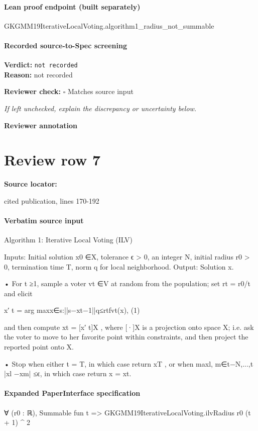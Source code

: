 \documentclass[10pt]{article}
\newcommand{\reviewerbox}{%
  \par\noindent\fbox{\parbox{0.96\linewidth}{\rule{0pt}{0.38in}}}\par
}
\newcommand{\reviewmatch}[1]{%
  \par\noindent\textbf{Reviewer check:} $\square$\; #1\par
  \noindent\emph{If left unchecked, explain the discrepancy or uncertainty below.}\par
}
\begin{document}
\paragraph{Lean proof endpoint (built separately)}\begin{ReviewVerbatim}
GKGMM19IterativeLocalVoting.algorithm1_radius_not_summable
\end{ReviewVerbatim}

\paragraph{Recorded source-to-Spec screening}
\textbf{Verdict:} \texttt{not recorded}
\\
\textbf{Reason:} not recorded
\reviewmatch{Matches source input}
\noindent\textbf{Reviewer annotation}\par
\reviewerbox
\clearpage
\hypertarget{source-claim-feefad880b5b8cc8}{}
\section*{Review row 7}
\textbf{Source locator:} {\footnotesize\raggedright cited publication, lines 170-\allowbreak{}192\par}
\paragraph{Verbatim source input}
\begin{ReviewVerbatim}
Algorithm 1: Iterative Local Voting (ILV)

Inputs:
Initial solution x0 ∈X, tolerance ϵ > 0, an integer N, initial radius r0 > 0,
termination time T, norm q for local neighborhood.
Output:
Solution x.

• For t ≥1, sample a voter vt ∈V at random from the population; set rt = r0/t
and elicit

x′
t = arg maxx∈{s:||s−xt−1||q≤rt}fvt(x),
(1)

and then compute xt = [x′
t]X , where [·]X is a projection onto space X; i.e. ask
the voter to move to her favorite point within constraints, and then project the
reported point onto X.

• Stop when either t = T, in which case return xT , or when
maxl, m∈{t−N,...,t} |xl −xm| ≤ϵ, in which case return x = xt.
\end{ReviewVerbatim}


\paragraph{Expanded PaperInterface specification}
\begin{ReviewVerbatim}
∀ (r0 : ℝ), Summable fun t => GKGMM19IterativeLocalVoting.ilvRadius r0 (t + 1) ^ 2
\end{ReviewVerbatim}
\end{document}
